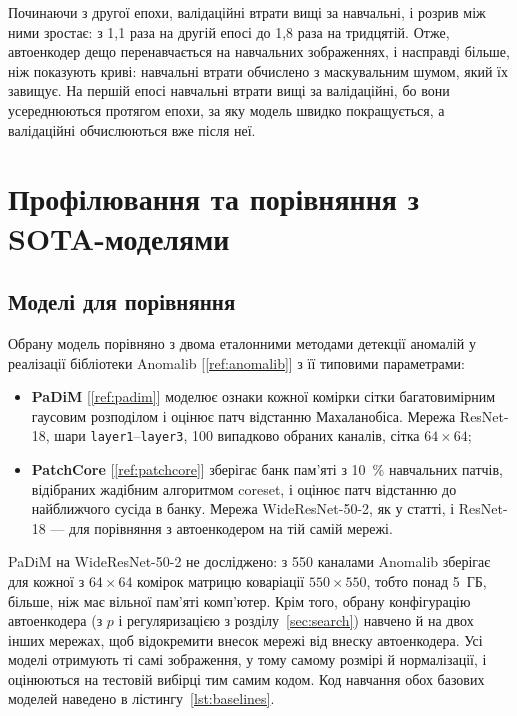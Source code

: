 \documentclass[14pt,a4paper]{extreport}
\begin{document}
Починаючи з другої епохи, валідаційні втрати вищі за навчальні, і розрив між ними зростає: з 1,1 раза на другій епосі до 1,8 раза на тридцятій. Отже, автоенкодер дещо перенавчається на навчальних зображеннях, і насправді більше, ніж показують криві: навчальні втрати обчислено з маскувальним шумом, який їх завищує. На першій епосі навчальні втрати вищі за валідаційні, бо вони усереднюються протягом епохи, за яку модель швидко покращується, а валідаційні обчислюються вже після неї.

\section{Профілювання та порівняння з SOTA-моделями}
\label{sec:benchmark}

\subsection{Моделі для порівняння}

Обрану модель порівняно з двома еталонними методами детекції аномалій у реалізації бібліотеки Anomalib [\ref{ref:anomalib}] з її типовими параметрами:

\begin{itemize}
\item \textbf{PaDiM} [\ref{ref:padim}] моделює ознаки кожної комірки сітки багатовимірним гаусовим розподілом і оцінює патч відстанню Махаланобіса. Мережа ResNet-18, шари \texttt{layer1}--\texttt{layer3}, 100 випадково обраних каналів, сітка $64 \times 64$;
\item \textbf{PatchCore} [\ref{ref:patchcore}] зберігає банк пам'яті з 10~\% навчальних патчів, відібраних жадібним алгоритмом coreset, і оцінює патч відстанню до найближчого сусіда в банку. Мережа WideResNet-50-2, як у статті, і ResNet-18 --- для порівняння з автоенкодером на тій самій мережі.
\end{itemize}

PaDiM на WideResNet-50-2 не досліджено: з 550 каналами Anomalib зберігає для кожної з $64 \times 64$ комірок матрицю коваріації $550 \times 550$, тобто понад 5~ГБ, більше, ніж має вільної пам'яті комп'ютер. Крім того, обрану конфігурацію автоенкодера (з $p$ і регуляризацією з розділу~\ref{sec:search}) навчено й на двох інших мережах, щоб відокремити внесок мережі від внеску автоенкодера. Усі моделі отримують ті самі зображення, у тому самому розмірі й нормалізації, і оцінюються на тестовій вибірці тим самим кодом. Код навчання обох базових моделей наведено в лістингу~\ref{lst:baselines}.
\end{document}
